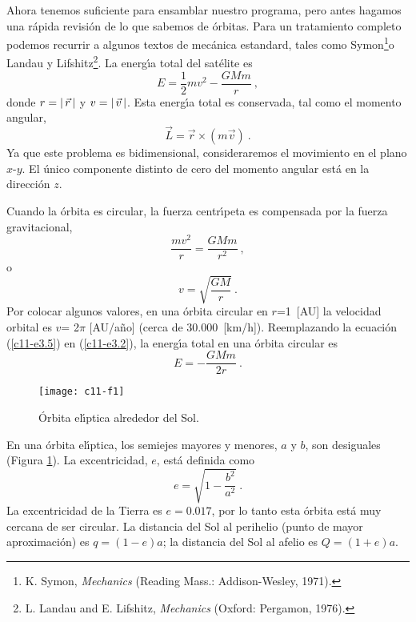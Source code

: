 Ahora tenemos suficiente para ensamblar nuestro programa, pero antes
hagamos una r{\'a}pida revisi{\'o}n de lo que sabemos de {\'o}rbitas. Para un
tratamiento completo podemos recurrir a algunos textos de mec{\'a}nica
estandard, tales como Symon\footnote{K. Symon, {\em Mechanics}
  (Reading Mass.: Addison-Wesley, 1971).}o Landau y
Lifshitz\footnote{L. Landau and E. Lifshitz, {\em Mechanics} (Oxford:
  Pergamon, 1976).}.  La energ{\'\i}a total del sat{\'e}lite es
\begin{equation}
\label{c11-e3.2}
E=\frac{1}{2}mv^2-\frac{GMm}{r}\ ,
\end{equation}
donde $r= \left\lvert\, \vec r \,\right\lvert$ y $v=\left\lvert\, \vec v \,\right\lvert$. Esta energ{\'\i}a total es
conservada, tal como el momento angular,
\begin{equation}
\label{c11-e3.3}
\vec L = \vec r \times (m\vec v)\ .
\end{equation}
Ya que este problema es bidimensional, consideraremos el movimiento en
el plano $x$-$y$. El {\'u}nico componente distinto de cero del momento
angular est{\'a} en la direcci{\'o}n $z$.  

Cuando la {\'o}rbita es circular, la fuerza centr{\'\i}peta es compensada por
la fuerza gravitacional,
\begin{equation}
\label{c11-e3.4}
\frac{mv^2}{r}=\frac{GMm}{r^2}\ ,
\end{equation}
o
\begin{equation}
\label{c11-e3.5}
v=\sqrt{\frac{GM}{r}}\ .
\end{equation}
Por colocar algunos valores, en una {\'o}rbita circular en $r$=1~[AU] la
velocidad orbital es $v$= 2$\pi$ [AU/a{\~n}o] (cerca de 30.000~[km/h]).
Reemplazando la ecuaci{\'o}n (\ref{c11-e3.5}) en (\ref{c11-e3.2}), la
energ{\'\i}a total en una {\'o}rbita circular es
\begin{equation}
\label{c11-e3.6}
E=-\frac{GMm}{2r}\ .
\end{equation}
\begin{figure}[h]
\begin{center}
\texttt{[image: c11-f1]}
\caption{{\'O}rbita el{\'\i}ptica alrededor del Sol.}\label{c11-f1}
\end{center}
\end{figure}
En una {\'o}rbita el{\'\i}ptica, los semiejes mayores y menores, $a$ y $b$, son
desiguales (Figura \ref{c11-f1}). La excentricidad, $e$, est{\'a}
definida como
\begin{equation}
\label{c11-e3.7}
e=\sqrt{1-\frac{b^2}{a^2}}\ .
\end{equation}
La excentricidad de la Tierra es $e=0.017$, por lo tanto esta {\'o}rbita
est{\'a} muy cercana de ser circular. La distancia del Sol al perihelio
(punto de mayor aproximaci{\'o}n) es $q=(1-e)a$; la distancia del Sol al
afelio es $Q=(1+e)a$.

